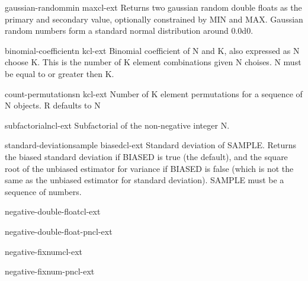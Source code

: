 \begin{function}{gaussian-random}{\op min max}{cl-ext}{}
  Returns two gaussian random double floats as the primary and secondary value,
optionally constrained by MIN and MAX. Gaussian random numbers form a standard
normal distribution around 0.0d0.
\end{function}

\begin{function}{binomial-coefficient}{n k}{cl-ext}{}
  Binomial coefficient of N and K, also expressed as N choose K. This is the
number of K element combinations given N choises. N must be equal to or
greater then K.
\end{function}

\begin{function}{count-permutations}{n \op k}{cl-ext}{}
  Number of K element permutations for a sequence of N objects.
R defaults to N
\end{function}

\begin{function}{subfactorial}{n}{cl-ext}{}
  Subfactorial of the non-negative integer N.
\end{function}

\begin{function}{standard-deviation}{sample \key biased}{cl-ext}{}
  Standard deviation of SAMPLE. Returns the biased standard deviation if
BIASED is true (the default), and the square root of the unbiased estimator
for variance if BIASED is false (which is not the same as the unbiased
estimator for standard deviation). SAMPLE must be a sequence of numbers.
\end{function}

\begin{type}{negative-double-float}{}{cl-ext}{}
  
\end{type}

\begin{function}{negative-double-float-p}{n}{cl-ext}{}
  
\end{function}

\begin{type}{negative-fixnum}{}{cl-ext}{}
  
\end{type}

\begin{function}{negative-fixnum-p}{n}{cl-ext}{}
  
\end{function}

